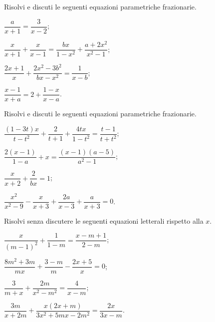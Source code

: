 \begin{esercizio}
\label{ese:17.57}
Risolvi e discuti le seguenti equazioni parametriche frazionarie.
\begin{multicols}{2}
\begin{enumeratea}
 \item $\dfrac{a}{x+1}=\dfrac{3}{x-2}$;
 \item $\dfrac{x}{x+1}+\dfrac{x}{x-1}=\dfrac{bx}{1-x^{2}}+\dfrac{a+2x^{2}}{x^{2}-1}$;
 \item $\dfrac{2x+1}{x}+\dfrac{2x^{2}-3b^{2}}{bx-x^{2}}=\dfrac{1}{x-b}$;
 \item $\dfrac{x-1}{x+a}=2+\dfrac{1-x}{x-a}$.
\end{enumeratea}
\end{multicols}
\end{esercizio}

\begin{esercizio}[\Ast]
\label{ese:17.58}
Risolvi e discuti le seguenti equazioni parametriche frazionarie.
\begin{multicols}{2}
\begin{enumeratea}
 \item $\dfrac{(1-3t)x}{t-t^{2}}+\dfrac{2}{t+1}+\dfrac{4tx}{1-t^{2}}=\dfrac{t-1}{t+t^{2}}$;
 \item $\dfrac{2(x-1)}{1-a}+x=\dfrac{(x-1)(a-5)}{a^{2}-1}$;
 \item $\dfrac{x}{x+2}+\dfrac{2}{bx}=1$;
 \item $\dfrac{x^{2}}{x^{2}-9}-\dfrac{x}{x+3}+\dfrac{2a}{x-3}+\dfrac{a}{x+3}=0$.
\end{enumeratea}
\end{multicols}
\end{esercizio}

\begin{esercizio}[\Ast]
\label{ese:17.59}
Risolvi senza discutere le seguenti equazioni letterali rispetto alla $x$.
\begin{multicols}{2}
\begin{enumeratea}
 \item $\dfrac{x}{(m-1)^{2}}+\dfrac{1}{1-m}=\dfrac{x-m+1}{2-m}$;
 \item $\dfrac{8m^{2}+3m}{mx}+\dfrac{3-m}{m}-\dfrac{2x+5}{x}=0$;
 \item $\dfrac{3}{m+x}+\dfrac{2m}{x^{2}-m^{2}}=\dfrac{4}{x-m}$;
 \item $\dfrac{3m}{x+2m}+\dfrac{x(2x+m)}{3x^{2}+5mx-2m^{2}}=\dfrac{2x}{3x-m}$.
\end{enumeratea}
\end{multicols}
\end{esercizio}

